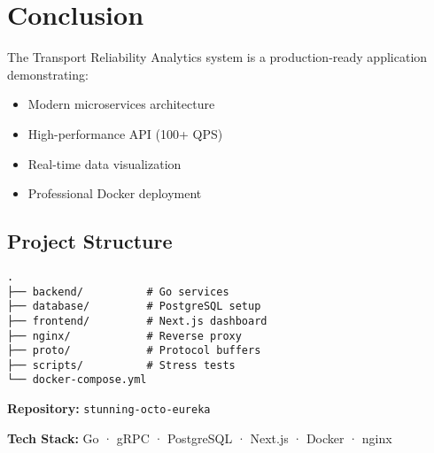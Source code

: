 \documentclass[11pt,a4paper]{article}
\begin{document}
\section{Conclusion}

The Transport Reliability Analytics system is a production-ready application demonstrating:

\begin{itemize}[leftmargin=*]
    \item Modern microservices architecture
    \item High-performance API (100+ QPS)
    \item Real-time data visualization
    \item Professional Docker deployment
\end{itemize}

\subsection{Project Structure}

\begin{lstlisting}
.
├── backend/          # Go services
├── database/         # PostgreSQL setup
├── frontend/         # Next.js dashboard
├── nginx/            # Reverse proxy
├── proto/            # Protocol buffers
├── scripts/          # Stress tests
└── docker-compose.yml
\end{lstlisting}

\vspace{1cm}

\noindent
\textbf{Repository:} \texttt{stunning-octo-eureka}

\noindent
\textbf{Tech Stack:} Go · gRPC · PostgreSQL · Next.js · Docker · nginx
\end{document}
